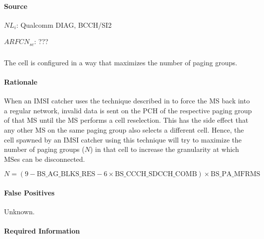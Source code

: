 \documentclass[a4paper,11pt,notitlepage,bigheadings,oneside]{scrartcl}
\begin{document}
\paragraph{Source}

$NL_i$: Qualcomm DIAG, BCCH/SI2




$ARFCN_{sc}$: ???


\subsubsection{}

The cell is configured in a way that maximizes the number of paging groups.

\paragraph{Rationale}

When an IMSI catcher uses the technique described in
\cite[0021]{bott2000verfahren} to force the MS back into a regular network,
invalid data is sent on the PCH of the respective paging group of that MS until
the MS performs a cell reselection. This has the side effect that any other MS
on the same paging group also selects a different cell. Hence, the cell spawned
by an IMSI catcher using this technique will try to maximize the number of
paging groups ($N$) in that cell to increase the granularity at which MSes can
be disconnected.

${N} = (9 - {\text{BS\_AG\_BLKS\_RES}} - 6\times {\text{BS\_CCCH\_SDCCH\_COMB}})\times {\text{BS\_PA\_MFRMS}}$

\paragraph{False Positives}

Unknown.

\paragraph{Required Information}
\end{document}
